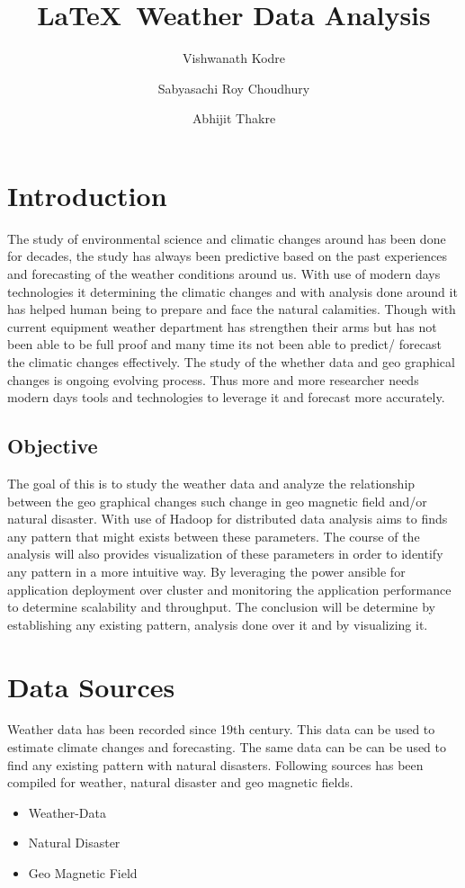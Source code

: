 \documentclass[9pt,twocolumn,twoside]{styles/osajnl}
\title{\LaTeX\ Weather Data Analysis}
\author[1]{Vishwanath Kodre}
\author[1]{Sabyasachi Roy Choudhury}
\author[1]{Abhijit Thakre}
\affil[1]{School of Informatics and Computing, Bloomington, IN 47408, U.S.A.}
\affil[1]{Corresponding authors: sabyasachi087@gmail.com, abhijit.thakre@gmail.com, vishwanath.kodre@gmail.com}
\begin{document}
\maketitle

\section{Introduction}

The study of environmental science and climatic changes around has been done for decades, the study
has always been predictive based on the past experiences and forecasting of the weather conditions
around us. With use of modern days technologies it determining the climatic changes and with analysis
done around it has helped human being to prepare and face the natural calamities. Though with current
equipment weather department has strengthen their arms but has not been able to be full proof and
many time its not been able to predict/ forecast the climatic changes effectively. The study of the
whether data and geo graphical changes is ongoing evolving process. Thus more and more researcher
needs modern days tools and technologies to leverage it and forecast more accurately.

\subsection{Objective}

The goal of this is to study the weather data and analyze the relationship between the geo graphical
changes such change in geo magnetic field and/or natural disaster. With use of Hadoop for distributed
data analysis aims to finds any pattern that might exists between these parameters. The course of the
analysis will also provides visualization of these parameters in order to identify any pattern in a more
intuitive way. By leveraging the power ansible for application deployment over cluster and monitoring
the application performance to determine scalability and throughput. The conclusion will be determine
by establishing any existing pattern, analysis done over it and by visualizing it.

\section{Data Sources}

Weather data has been recorded since 19th century. This data can be used to estimate climate changes
and forecasting. The same data can be can be used to find any existing pattern with natural disasters.
Following sources has been compiled for weather, natural disaster and geo magnetic fields.
\begin{itemize}
\item Weather-Data\cite{Weather-Data}
\item Natural Disaster\cite{Disaster-List-Data}
\item Geo Magnetic Field\cite{Geo-Magnetic-Data}
\end{itemize}
\end{document}
